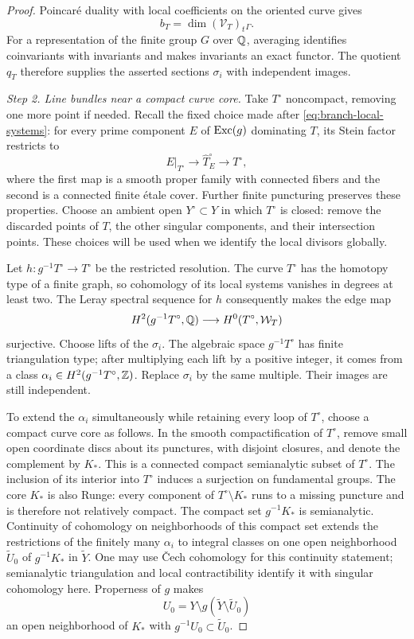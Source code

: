 \begin{proof}
Poincar\'e duality with local coefficients on the oriented curve gives
\[
 b_T=\dim(\mathcal V_T)_t{}_{\Gamma}.
\]
For a representation of the finite group \(G\) over \(\mathbb{Q}\), averaging
identifies coinvariants with invariants and makes invariants an exact
functor.  The quotient \(q_T\) therefore supplies the asserted sections
\(\sigma_i\) with independent images.

\emph{Step 2. Line bundles near a compact curve core.}
Take \(T^\circ\) noncompact, removing one more point if needed.
Recall the fixed choice made after \eqref{eq:branch-local-systems}:
for every prime component \(E\) of \(\operatorname{Exc}(g)\) dominating \(T\),
its Stein factor restricts to
\begin{equation}\label{eq:global-divisor-family}
 E|_{T^\circ}\longrightarrow \widehat T_E^\circ\longrightarrow T^\circ,
\end{equation}
where the first map is a smooth proper family with connected fibers
and the second is a connected finite \'etale cover.  Further finite
puncturing preserves these properties.  Choose an ambient open
\(Y^\circ\subset Y\) in which \(T^\circ\) is closed: remove the
discarded points of \(T\), the other singular components, and their
intersection points.  These choices will be used when we identify the
local divisors globally.

Let \(h:g^{-1}T^\circ\to T^\circ\) be the restricted resolution.
The curve \(T^\circ\) has the homotopy type of a finite graph, so
cohomology of its local systems vanishes in degrees at least two.
The Leray spectral sequence for \(h\) consequently makes the edge map
\[
 H^2(g^{-1}T^\circ,\mathbb{Q})
 \longrightarrow H^0(T^\circ,\mathcal W_T)
\]
surjective.  Choose lifts of the \(\sigma_i\).  The algebraic space
\(g^{-1}T^\circ\) has finite triangulation type; after multiplying
each lift by a positive integer, it comes from a class
\(\alpha_i\in H^2(g^{-1}T^\circ,\mathbb{Z})\).  Replace \(\sigma_i\) by the
same multiple.  Their images are still independent.

To extend the \(\alpha_i\) simultaneously while retaining every loop
of \(T^\circ\), choose a compact curve core as follows.  In the smooth
compactification of \(T^\circ\), remove small open
coordinate discs about its punctures, with disjoint closures, and denote the complement by
\(K_*\).  This is a connected compact semianalytic subset of
\(T^\circ\).  The inclusion of its interior into \(T^\circ\) induces
a surjection on fundamental groups.  The core \(K_*\) is also Runge: every component of
\(T^\circ\setminus K_*\) runs to a missing puncture and is therefore
not relatively compact.  The compact set \(g^{-1}K_*\) is
semianalytic.  Continuity of cohomology on neighborhoods of this
compact set extends the restrictions of the finitely many
\(\alpha_i\) to integral classes on one open neighborhood
\(\widetilde U_0\) of \(g^{-1}K_*\) in \(\widetilde Y\).
One may use \v{C}ech cohomology for this continuity statement;
semianalytic triangulation and local contractibility identify it with
singular cohomology here.  Properness of \(g\) makes
\[
 U_0=Y\setminus g(\widetilde Y\setminus\widetilde U_0)
\]
an open neighborhood of \(K_*\) with \(g^{-1}U_0\subset\widetilde U_0\).


\end{proof}
